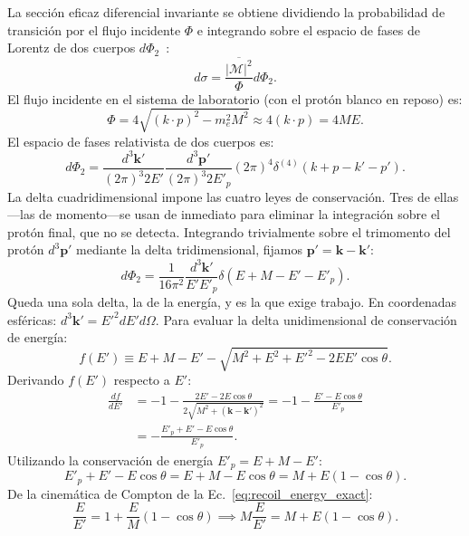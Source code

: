 \documentclass[10pt,a4paper]{article}
\begin{document}
La sección eficaz diferencial invariante se obtiene dividiendo la probabilidad de transición por el flujo incidente $\Phi$ e integrando sobre el espacio de fases de Lorentz de dos cuerpos $d\Phi_2$~\cite{halzen1984,griffiths2008}:
\begin{equation}
d\sigma = \frac{\overline{|\mathcal{M}|^2}}{\Phi} d\Phi_2.
\end{equation}
El flujo incidente en el sistema de laboratorio (con el protón blanco en reposo) es:
\begin{equation}
\Phi = 4 \sqrt{(k \cdot p)^2 - m_e^2 M^2} \approx 4 (k \cdot p) = 4 M E.
\end{equation}
El espacio de fases relativista de dos cuerpos es:
\begin{equation}
d\Phi_2 = \frac{d^3\mathbf{k}'}{(2\pi)^3 2E'} \frac{d^3\mathbf{p}'}{(2\pi)^3 2E'_p} (2\pi)^4 \delta^{(4)}(k + p - k' - p').
\end{equation}
La delta cuadridimensional impone las cuatro leyes de conservación. Tres de ellas---las de momento---se usan de inmediato para eliminar la integración sobre el protón final, que no se detecta. Integrando trivialmente sobre el trimomento del protón $d^3\mathbf{p}'$ mediante la delta tridimensional, fijamos $\mathbf{p}' = \mathbf{k} - \mathbf{k}'$:
\begin{equation}
d\Phi_2 = \frac{1}{16\pi^2} \frac{d^3\mathbf{k}'}{E' E'_p} \delta(E + M - E' - E'_p).
\end{equation}
Queda una sola delta, la de la energía, y es la que exige trabajo. En coordenadas esféricas: $d^3\mathbf{k}' = E'^2 dE' d\Omega$. Para evaluar la delta unidimensional de conservación de energía:
\begin{equation}
f(E') \equiv E + M - E' - \sqrt{M^2 + E^2 + E'^2 - 2 E E' \cos\theta}.
\end{equation}
Derivando $f(E')$ respecto a $E'$:
\begin{align}
\frac{df}{dE'} &= -1 - \frac{2E' - 2E\cos\theta}{2\sqrt{M^2 + (\mathbf{k}-\mathbf{k}')^2}} = -1 - \frac{E' - E\cos\theta}{E'_p} \nonumber \\
&= -\frac{E'_p + E' - E\cos\theta}{E'_p}.
\end{align}
Utilizando la conservación de energía $E'_p = E + M - E'$:
\begin{equation}
E'_p + E' - E\cos\theta = E + M - E\cos\theta = M + E(1 - \cos\theta).
\end{equation}
De la cinemática de Compton de la Ec.~\eqref{eq:recoil_energy_exact}:
\begin{equation}
\frac{E}{E'} = 1 + \frac{E}{M}(1 - \cos\theta) \implies M \frac{E}{E'} = M + E(1 - \cos\theta).
\end{equation}
\end{document}
